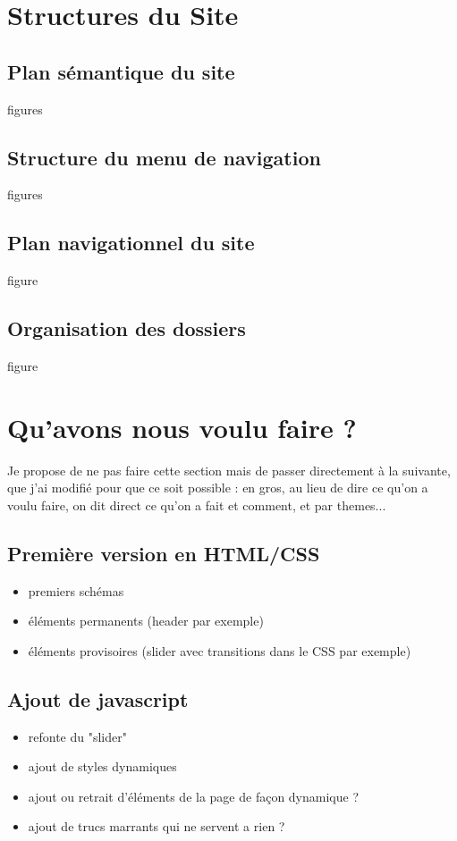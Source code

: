 \documentclass{scrartcl}
\begin{document}
\section{Structures du Site}
\subsection{Plan sémantique du site}
figures
\subsection{Structure du menu de navigation}
figures
\subsection{Plan navigationnel du site}
figure
\subsection{Organisation des dossiers}
figure

\section{Qu'avons nous voulu faire ?}
Je propose de ne pas faire cette section mais de passer directement à la suivante, que j'ai modifié pour que ce soit possible : en gros, au lieu de dire ce qu'on a voulu faire, on dit direct ce qu'on a fait et comment, et par themes...

\subsection{Première version en HTML/CSS}
\begin{itemize}
\item premiers schémas
\item éléments permanents (header par exemple)
\item éléments provisoires (slider avec transitions dans le CSS par exemple)
\end{itemize}


\subsection{Ajout de javascript}
\begin{itemize}
\item refonte du "slider"
\item ajout de styles dynamiques
\item ajout ou retrait d'éléments de la page de façon dynamique ?
\item ajout de trucs marrants qui ne servent a rien ?
\end{itemize}
\end{document}
